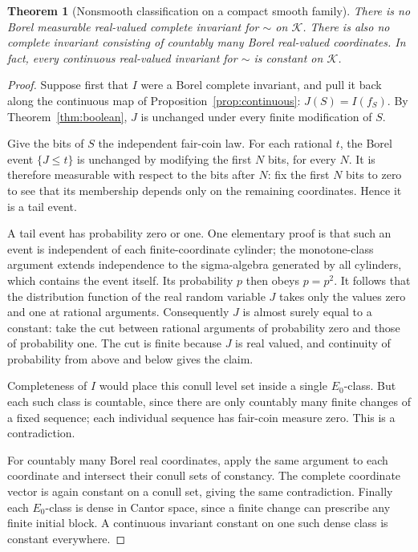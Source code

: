 \documentclass[11pt,a4paper]{article}
\newtheorem{theorem}{Theorem}[section]
\theoremstyle{definition}
\theoremstyle{remark}
\begin{document}
\begin{theorem}[Nonsmooth classification on a compact smooth family]
\label{thm:nonsmooth}
There is no Borel measurable real-valued complete invariant for $\sim$ on
$\mathcal K$. There is also no complete invariant consisting of countably
many Borel real-valued coordinates. In fact, every continuous real-valued
invariant for $\sim$ is constant on $\mathcal K$.
\end{theorem}
\begin{proof}
Suppose first that $I$ were a Borel complete invariant, and pull it back
along the continuous map of Proposition~\ref{prop:continuous}:
$J(S)=I(f_S)$. By Theorem~\ref{thm:boolean}, $J$ is unchanged under every
finite modification of $S$.

Give the bits of $S$ the independent fair-coin law. For each rational $t$,
the Borel event $\{J\le t\}$ is unchanged by modifying the first $N$ bits,
for every $N$. It is therefore measurable with respect to the bits after
$N$: fix the first $N$ bits to zero to see that its membership depends only
on the remaining coordinates. Hence it is a tail event.

A tail event has probability zero or one. One elementary proof is that
such an event is independent of each finite-coordinate cylinder; the
monotone-class argument extends independence to the sigma-algebra generated
by all cylinders, which contains the event itself. Its probability $p$
then obeys $p=p^2$.
It follows that the distribution function of the real random variable
$J$ takes only the values zero and one at rational arguments. Consequently
$J$ is almost surely equal to a constant: take the cut between rational
arguments of probability zero and those of probability one. The cut is
finite because $J$ is real valued, and continuity of probability from
above and below gives the claim.

Completeness of $I$ would place this conull level set inside a single
$E_0$-class. But each such class is countable, since there are only
countably many finite changes of a fixed sequence; each individual sequence
has fair-coin measure zero. This is a contradiction.

For countably many Borel real coordinates, apply the same argument to each
coordinate and intersect their conull sets of constancy. The complete
coordinate vector is again constant on a conull set, giving the same
contradiction. Finally each $E_0$-class is dense in Cantor space, since a
finite change can prescribe any finite initial block. A continuous invariant
constant on one such dense class is constant everywhere.
\end{proof}
\end{document}
